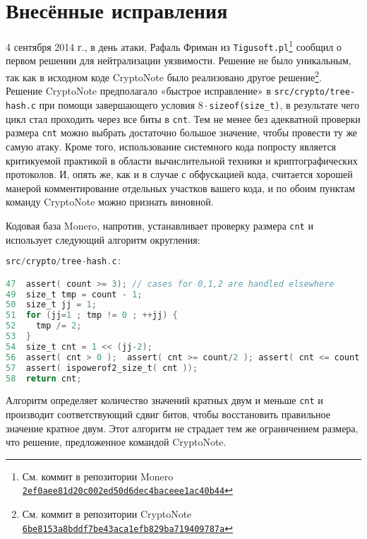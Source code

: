 \documentclass{mrl}
\begin{document}
\section{Внесённые исправления}
4 сентября 2014 г., в день атаки, Рафаль Фриман из \texttt{Tigusoft.pl}\footnote{См. коммит в репозитории Monero \href{https://github.com/monero-project/bitmonero/commit/2ef0aee81d20c002ed50d6dec4baceee1ac40b44}{\nolinkurl{2ef0aee81d20c002ed50d6dec4baceee1ac40b44}}} сообщил о первом решении для нейтрализации уязвимости. Решение не было уникальным, так как в исходном коде CryptoNote было реализовано другое решение\footnote{См. коммит в репозитории CryptoNote \href{https://github.com/cryptonotefoundation/cryptonote/commit/6be8153a8bddf7be43aca1efb829ba719409787a}{\nolinkurl{6be8153a8bddf7be43aca1efb829ba719409787a}}}. Решение CryptoNote предполагало «быстрое исправление» в \linebreak \texttt{src/crypto/tree-hash.c} при помощи завершающего условия \texttt{$8\cdot$sizeof(size\_t)}, в результате чего цикл стал проходить через все биты в \texttt{cnt}. Тем не менее без адекватной проверки размера \texttt{cnt} можно выбрать достаточно большое значение, чтобы провести ту же самую атаку. Кроме того, использование системного кода попросту является критикуемой практикой в области вычислительной техники и криптографических протоколов. И, опять же, как и в случае с обфускацией кода, считается хорошей манерой комментирование отдельных участков вашего кода, и по обоим пунктам команду CryptoNote можно признать виновной.

Кодовая база Monero, напротив, устанавливает проверку размера \texttt{cnt} и использует следующий алгоритм округления:

\begin{lstlisting}[language=C]
src/crypto/tree-hash.c:

47  assert( count >= 3); // cases for 0,1,2 are handled elsewhere
49  size_t tmp = count - 1;
50  size_t jj = 1;
51  for (jj=1 ; tmp != 0 ; ++jj) {
52    tmp /= 2;
53  }
54  size_t cnt = 1 << (jj-2);
56  assert( cnt > 0 );	assert( cnt >= count/2 ); assert( cnt <= count );
57  assert( ispowerof2_size_t( cnt ));
58  return cnt;

\end{lstlisting}

Алгоритм определяет количество значений кратных двум и меньше \texttt{cnt} и производит соответствующий сдвиг битов, чтобы восстановить правильное значение кратное двум. Этот алгоритм не страдает тем же ограничением размера, что решение, предложенное командой CryptoNote.
\end{document}
